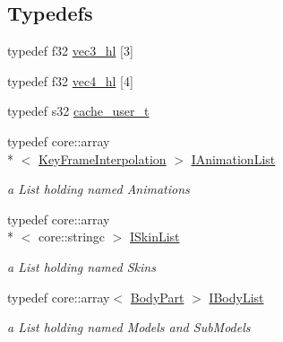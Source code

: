 \subsection*{Typedefs}
\begin{DoxyCompactItemize}
\item 
typedef f32 \hyperlink{namespaceirr_1_1scene_a3b7d6a49ddd097de1db184c2227691f9}{vec3\-\_\-hl} \mbox{[}3\mbox{]}
\item 
typedef f32 \hyperlink{namespaceirr_1_1scene_aa60b31c24ff8ea9b12ded57166f93631}{vec4\-\_\-hl} \mbox{[}4\mbox{]}
\item 
typedef s32 \hyperlink{namespaceirr_1_1scene_ac6a6f93a71f58df385c659d6cd36b930}{cache\-\_\-user\-\_\-t}
\item 
typedef core\-::array\\*
$<$ \hyperlink{structirr_1_1scene_1_1_key_frame_interpolation}{Key\-Frame\-Interpolation} $>$ \hyperlink{namespaceirr_1_1scene_a88c0ab57991ea513ec59370ffe857645}{I\-Animation\-List}
\begin{DoxyCompactList}\small\item\em a List holding named Animations \end{DoxyCompactList}\item 
typedef core\-::array\\*
$<$ core\-::stringc $>$ \hyperlink{namespaceirr_1_1scene_a52c062d51167e7fc2138c53b19fdd5a1}{I\-Skin\-List}
\begin{DoxyCompactList}\small\item\em a List holding named Skins \end{DoxyCompactList}\item 
typedef core\-::array$<$ \hyperlink{structirr_1_1scene_1_1_body_part}{Body\-Part} $>$ \hyperlink{namespaceirr_1_1scene_af44e95def4b0a3d4b69b3a0c3b3cbc2a}{I\-Body\-List}
\begin{DoxyCompactList}\small\item\em a List holding named Models and Sub\-Models \end{DoxyCompactList}\end{DoxyCompactItemize}
